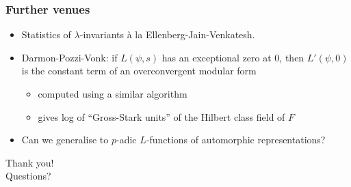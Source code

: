 \documentclass[10pt]{beamer}
\begin{document}
\begin{frame}
  \frametitle{Further venues}
  \begin{itemize}[leftmargin=2pt]
  \item Statistics of $\lambda$-invariants à la Ellenberg-Jain-Venkatesh.\pause
\item Darmon-Pozzi-Vonk: if $L(\psi,s)$ has an exceptional zero at $0$, then $L'(\psi,0)$ is the
  constant term of an overconvergent modular form\pause
  \begin{itemize}
  \item computed using a similar algorithm\pause
  \item gives log of ``Gross-Stark units'' of the Hilbert class
    field of $F$\pause
  \end{itemize}
\item Can we generalise to $p$-adic
  $L$-functions of automorphic representations?
\end{itemize}

\end{frame}
\begin{frame}[standout]
  Thank you! \\ 
  Questions?
\end{frame}
\end{document}
